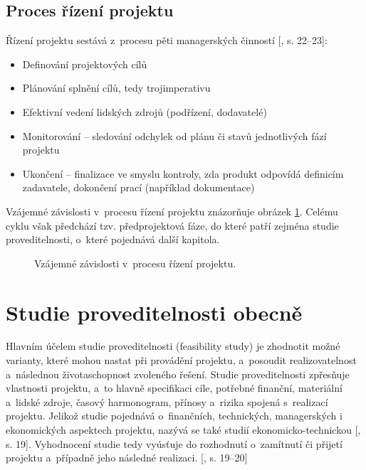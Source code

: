 \documentclass[
	11pt, oneside, printed, final, palatino
	microtype,
	table,   %
	lof,     %
	lot     %
]{fithesis3}
\newcommand{\citepages}[2]{[\cite{#2}, s. #1]}
\newcommand{\mezera}{\bigskip}
\begin{document}
{\subsection{Proces řízení projektu}
Řízení projektu sestává z~procesu pěti managerských činností \citepages{22–23}{rehacek_2013}:
\mezera
\begin{itemize}
\item Definování projektových cílů
\item Plánování splnění cílů, tedy trojimperativu
\item Efektivní vedení lidských zdrojů (podřízení, dodavatelé)
\item Monitorování – sledování odchylek od plánu či stavů jednotlivých fází projektu
\item Ukončení – finalizace ve smyslu kontroly, zda produkt odpovídá definicím zadavatele, dokončení prací (například dokumentace)
\end{itemize}

Vzájemné závislosti v~procesu řízení projektu znázorňuje obrázek \ref{fig:proces_rizeni_projektu}.
Celému cyklu však předchází tzv. předprojektová fáze, do které patří zejména studie proveditelnosti, o~které pojednává další kapitola.

\begin{figure}
    \centering
	\def\svgwidth{2.0\textwidth}
    
	\caption{Vzájemné závislosti v~procesu řízení projektu.}
	\label{fig:proces_rizeni_projektu}
\end{figure}

\section{Studie proveditelnosti obecně} \label{sec:studie_proveditelnosti}

Hlavním účelem studie proveditelnosti (feasibility study) je zhodnotit možné varianty, které mohou nastat při provádění projektu, a~posoudit realizovatelnost a~následnou životaschopnost zvoleného řešení. Studie proveditelnosti zpřesňuje vlastnosti projektu, a~to hlavně specifikaci cíle, potřebné finanční, materiální a~lidské zdroje, časový harmonogram, přínosy a~rizika spojená s~realizací projektu. Jelikož studie pojednává o~finančních, technických, managerských i ekonomických aspektech projektu, nazývá se také studií ekonomicko-technickou \citepages{19}{fotr_1995}. Vyhodnocení studie tedy vyúsťuje do rozhodnutí o~zamítnutí či přijetí projektu a~případně jeho následné realizaci. \citepages{19–20}{fotr_1995} 

}
\end{document}
